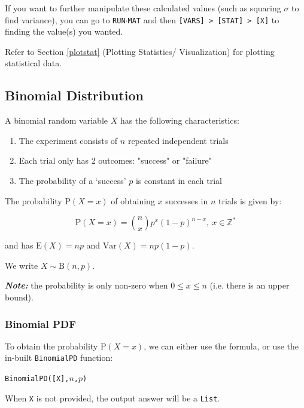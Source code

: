 \documentclass[a5paper,draft]{memoir}
\def\code#1{\texttt{#1}}
\def\note#1{\textbf{\textit{Note:}} #1}
\def\runmat{\code{RUN$\cdot$MAT} }
\newcommand{\addtoindex}[1]{#1\index{#1}}
\begin{document}
If you want to further manipulate these calculated values (such as squaring $\sigma$ to find variance), you can go to \runmat and then \code{[VARS] > [STAT] > [X]} to finding the value(s) you wanted.

Refer to Section \ref{plotstat} (Plotting Statistics/ Visualization) for plotting statistical data.

\subsection{Binomial Distribution} \label{binom}
A binomial random variable $X$ has the following characteristics:
\begin{enumerate}
	\item The experiment consists of $n$ repeated independent trials
	\item Each trial only has 2 outcomes: "success" or "failure"
	\item The probability of a `success' $p$ is constant in each trial
\end{enumerate}

The probability $\textrm{P}(X = x)$ of obtaining $x$ successes in $n$ trials is given by:

\begin{equation}
	\mathrm{P}(X=x) = {n \choose x} p^x(1-p)^{n-x},~x \in \mathbb{Z}^*
\end{equation}

and has $\mathrm{E}(X) = np$ and $\mathrm{Var}(X)=np(1-p)$.

We write $X \sim \mathrm{B}(n, p)$.

\note{the probability is only non-zero when $0 \leq x \leq n$ (i.e. there is an upper bound).}

\subsubsection{Binomial PDF}

To obtain the probability $\textrm{P}(X = x)$, we can either use the formula, or use the in-built \code{\addtoindex{BinomialPD}} function:
\begin{center}
	\code{BinomialPD([X],$n$,$p$)}
\end{center}

When \code{X} is not provided, the output answer will be a \code{List}.
\end{document}

